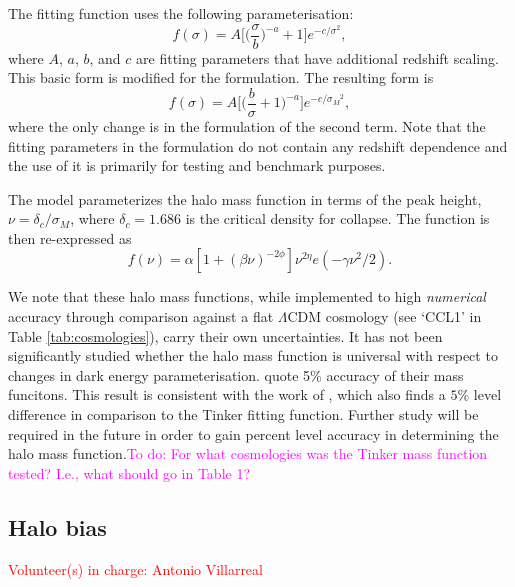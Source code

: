 \documentclass[\docopts]{\docclass}
\newcommand{\todo}[1]{\textcolor{magenta}{To do: #1}}
\newcommand{\vol}[1]{\textcolor{red}{Volunteer(s) in charge: #1}}
\begin{document}
The \citet{Tinker2008} fitting function uses the following parameterisation:
\begin{equation}
f(\sigma)=A\Big[\Big(\frac{\sigma}{b}\Big)^{-a}+1\Big]e^{-c/{\sigma}^2},
\end{equation}
where $A$, $a$, $b$, and $c$ are fitting parameters that have additional redshift scaling. This basic form is modified for the \citet{Angulo2012} formulation. The resulting form is
\begin{equation}
f(\sigma)=A\Big[\Big(\frac{b}{\sigma}+1\Big)^{-a}\Big]e^{-c/{\sigma_M}^2},
\end{equation}
where the only change is in the formulation of the second term. Note that the fitting parameters in the \citet{Angulo2012} formulation do not contain any redshift dependence and the use of it is primarily for testing and benchmark purposes.

The \citet{Tinker2010} model parameterizes the halo mass function in terms of the peak height, $\nu = \delta_c/\sigma_M$, where $\delta_c=1.686$ is the critical density for collapse. The function is then re-expressed as
\begin{equation}
  f(\nu) = \alpha[1+(\beta\nu)^{-2\phi}]\nu^{2\eta}e(-\gamma\nu^2/2).
\end{equation}

We note that these halo mass functions, while implemented to high {\em numerical} accuracy through comparison against a flat $\Lambda$CDM cosmology (see `CCL1' in Table  \ref{tab:cosmologies}), carry their own uncertainties. It has not been significantly studied whether the halo mass function is universal with respect to changes in dark energy parameterisation.
\citet{Tinker2008,Tinker2010} quote 5\% accuracy of their mass funcitons.
This result is consistent with the work of \citet{Watson2013}, which also finds a $5\%$ level difference in comparison to the Tinker fitting function. Further study will be required in the future in order to gain percent level accuracy in determining the halo mass function.\todo{For what cosmologies was the Tinker mass function tested? I.e., what should go in Table 1?}

\subsection{Halo bias}
\vol{Antonio Villarreal}
\end{document}
